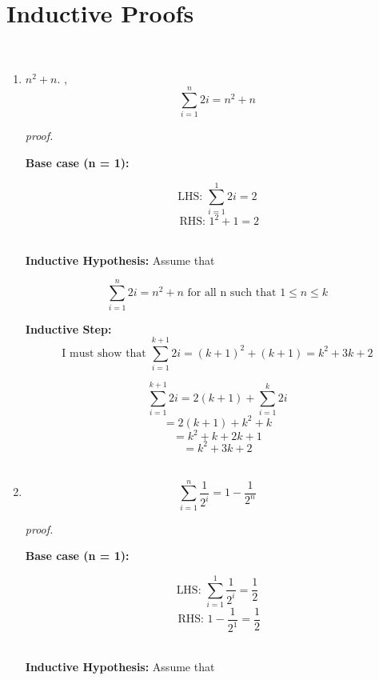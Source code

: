 \documentclass[12pt]{article}
\begin{document}
\rhead{\today}
 
 
\section{Inductive Proofs}

\\
 
\begin{enumerate}

\item 
{} $n^2 + n$. 
, $$\sum_{i=1}^{n} 2i =  n^2 + n$$

\textit{proof.}

\textbf{Base case (n = 1):  } 

$$\text{LHS:  }\sum_{i=1}^{1}{2i} = 2$$
$$\text{ RHS:  }1^2 +1 = 2 $$ \\


\textbf{Inductive Hypothesis: } Assume that

$$\sum_{i=1}^{n} 2i =  n^2 + n \text{   for all n such that } 1\le n \le k$$

\textbf{Inductive Step: } 
$$\text{I must show that  }\sum_{i=1}^{k+1} 2i =  (k+1)^2 + (k+1) = k^2 + 3k + 2$$


$$\sum_{i=1}^{k+1} 2i = 2(k+1) + \sum_{i=1}^{k} 2i$$
$$ = 2(k+1) +k^2 + k $$
$$= k^2 + k + 2k + 1$$
$$= k^2 + 3k + 2 $$\\


\item 
$$\sum_{i=1}^{n} \frac{1}{2^i} =  1 - \frac{1}{2^n}$$

\textit{proof.}

\textbf{Base case (n = 1):  } 

$$\text{LHS:  }\sum_{i=1}^{1} \frac{1}{2^i} = \frac{1}{2}$$
$$\text{ RHS:  } 1 - \frac{1}{2^1} = \frac{1}{2} $$ \\


\textbf{Inductive Hypothesis: } Assume that


\end{enumerate}
\end{document}
